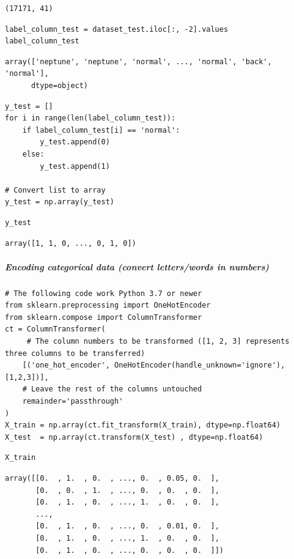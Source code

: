\begin{verbatim}
(17171, 41)
\end{verbatim}

\begin{verbatim}
label_column_test = dataset_test.iloc[:, -2].values
label_column_test
\end{verbatim}

\begin{verbatim}
array(['neptune', 'neptune', 'normal', ..., 'normal', 'back', 'normal'],
      dtype=object)
\end{verbatim}

\begin{verbatim}
y_test = []
for i in range(len(label_column_test)):
    if label_column_test[i] == 'normal':
        y_test.append(0)
    else:
        y_test.append(1)

# Convert list to array
y_test = np.array(y_test)
\end{verbatim}

\begin{verbatim}
y_test
\end{verbatim}

\begin{verbatim}
array([1, 1, 0, ..., 0, 1, 0])
\end{verbatim}

\subparagraph{Encoding categorical data (convert letters/words in numbers)}

\begin{verbatim}
# The following code work Python 3.7 or newer
from sklearn.preprocessing import OneHotEncoder
from sklearn.compose import ColumnTransformer
ct = ColumnTransformer(
     # The column numbers to be transformed ([1, 2, 3] represents three columns to be transferred)
    [('one_hot_encoder', OneHotEncoder(handle_unknown='ignore'), [1,2,3])],
    # Leave the rest of the columns untouched
    remainder='passthrough'
)
X_train = np.array(ct.fit_transform(X_train), dtype=np.float64)
X_test  = np.array(ct.transform(X_test) , dtype=np.float64)
\end{verbatim}

\begin{verbatim}
X_train
\end{verbatim}

\begin{verbatim}
array([[0.  , 1.  , 0.  , ..., 0.  , 0.05, 0.  ],
       [0.  , 0.  , 1.  , ..., 0.  , 0.  , 0.  ],
       [0.  , 1.  , 0.  , ..., 1.  , 0.  , 0.  ],
       ...,
       [0.  , 1.  , 0.  , ..., 0.  , 0.01, 0.  ],
       [0.  , 1.  , 0.  , ..., 1.  , 0.  , 0.  ],
       [0.  , 1.  , 0.  , ..., 0.  , 0.  , 0.  ]])
\end{verbatim}

